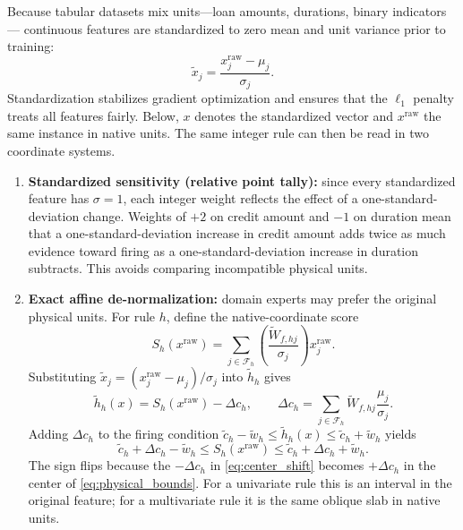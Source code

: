 Because tabular datasets mix units---loan amounts, durations, binary indicators---
continuous features are standardized to zero mean and unit variance prior to
training:
\begin{equation}
\tilde{x}_j = \frac{x_j^{\text{raw}} - \mu_j}{\sigma_j}.
\label{eq:standardization}
\end{equation}
Standardization stabilizes gradient optimization and ensures that the $\ell_1$
penalty treats all features fairly. Below, $x$ denotes the standardized vector and
$x^{\text{raw}}$ the same instance in native units. The same integer rule can then
be read in two coordinate systems.
\begin{enumerate}
    \item \textbf{Standardized sensitivity (relative point tally):} since every
    standardized feature has $\sigma = 1$, each integer weight reflects the effect
    of a one-standard-deviation change. Weights of $+2$ on credit amount and $-1$
    on duration mean that a one-standard-deviation increase in credit amount adds
    twice as much evidence toward firing as a one-standard-deviation increase in
    duration subtracts. This avoids comparing incompatible physical units.

    \item \textbf{Exact affine de-normalization:} domain experts may prefer the
    original physical units. For rule $h$, define the native-coordinate score
    \begin{equation}
    S_h(x^{\text{raw}})
    =
    \sum_{j \in \mathcal{F}_h}
    \left(\frac{\widetilde{W}_{f,hj}}{\sigma_j}\right)x_j^{\text{raw}}.
    \label{eq:raw_score}
    \end{equation}
    Substituting $\tilde{x}_j=(x_j^{\text{raw}}-\mu_j)/\sigma_j$ into
    $\tilde{h}_h$ gives
    \begin{equation}
    \tilde{h}_h(x)
    =
    S_h(x^{\text{raw}})-\Delta c_h,
    \qquad
    \Delta c_h
    =
    \sum_{j \in \mathcal{F}_h}
    \widetilde{W}_{f,hj}\frac{\mu_j}{\sigma_j}.
    \label{eq:center_shift}
    \end{equation}
    Adding $\Delta c_h$ to the firing condition
    $\widetilde{c}_h-\widetilde{w}_h\le\tilde{h}_h(x)\le\widetilde{c}_h+\widetilde{w}_h$
    yields
    \begin{equation}
    \label{eq:physical_bounds}
    \widetilde{c}_h+\Delta c_h-\widetilde{w}_h
    \le S_h(x^{\text{raw}})
    \le \widetilde{c}_h+\Delta c_h+\widetilde{w}_h.
    \end{equation}
    The sign flips because the $-\Delta c_h$ in \eqref{eq:center_shift} becomes
    $+\Delta c_h$ in the center of \eqref{eq:physical_bounds}. For a univariate
    rule this is an interval in the original feature; for a multivariate rule it is
    the same oblique slab in native units.
\end{enumerate}

